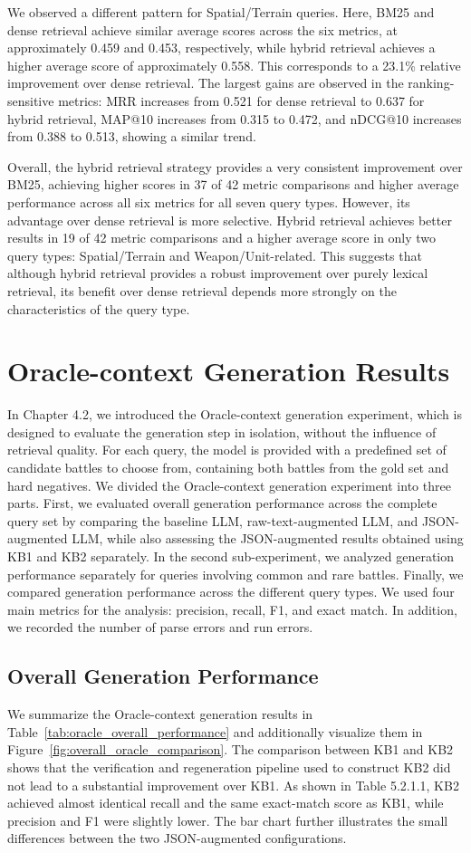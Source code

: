 We observed a different pattern for Spatial/Terrain queries. Here, BM25 and dense retrieval achieve similar average scores across the six metrics, at approximately 0.459 and 0.453, respectively, while hybrid retrieval achieves a higher average score of approximately 0.558. This corresponds to a 23.1\% relative improvement over dense retrieval. The largest gains are observed in the ranking-sensitive metrics: MRR increases from 0.521 for dense retrieval to 0.637 for hybrid retrieval, MAP@10 increases from 0.315 to 0.472, and nDCG@10 increases from 0.388 to 0.513, showing a similar trend.

Overall, the hybrid retrieval strategy provides a very consistent improvement over BM25, achieving higher scores in 37 of 42 metric comparisons and higher average performance across all six metrics for all seven query types. However, its advantage over dense retrieval is more selective. Hybrid retrieval achieves better results in 19 of 42 metric comparisons and a higher average score in only two query types: Spatial/Terrain and Weapon/Unit-related. This suggests that although hybrid retrieval provides a robust improvement over purely lexical retrieval, its benefit over dense retrieval depends more strongly on the characteristics of the query type.
\section{Oracle-context Generation Results}
In Chapter 4.2, we introduced the Oracle-context generation experiment, which is designed to evaluate the generation step in isolation, without the influence of retrieval quality. For each query, the model is provided with a predefined set of candidate battles to choose from, containing both battles from the gold set and hard negatives. We divided the Oracle-context generation experiment into three parts. First, we evaluated overall generation performance across the complete query set by comparing the baseline LLM, raw-text-augmented LLM, and JSON-augmented LLM, while also assessing the JSON-augmented results obtained using KB1 and KB2 separately. In the second sub-experiment, we analyzed generation performance separately for queries involving common and rare battles. Finally, we compared generation performance across the different query types. We used four main metrics for the analysis: precision, recall, F1, and exact match. In addition, we recorded the number of parse errors and run errors.
\subsection{Overall Generation Performance}
We summarize the Oracle-context generation results in Table~\ref{tab:oracle_overall_performance} and additionally visualize them in Figure~\ref{fig:overall_oracle_comparison}. The comparison between KB1 and KB2 shows that the verification and regeneration pipeline used to construct KB2 did not lead to a substantial improvement over KB1. As shown in Table 5.2.1.1, KB2 achieved almost identical recall and the same exact-match score as KB1, while precision and F1 were slightly lower. The bar chart further illustrates the small differences between the two JSON-augmented configurations.

